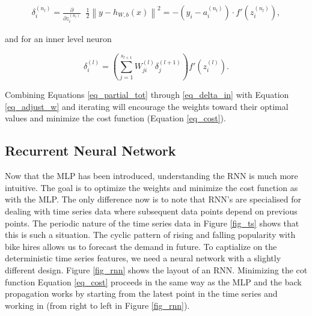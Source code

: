 \documentclass[10pt]{article}
\begin{document}
\begin{align}
\delta^{(n_l)}_i
= \frac{\partial}{\partial z^{(n_l)}_i} \;\;
\frac{1}{2} \left\|y - h_{W,b}(x)\right\|^2 = - (y_i - a^{(n_l)}_i) \cdot f'(z^{(n_l)}_i),
\label{eq_delta}
\end{align}


\noindent and for an inner level neuron

\begin{equation}
\delta^{(l)}_i = \left( \sum_{j=1}^{s_{l+1}} W^{(l)}_{ji} \delta^{(l+1)}_j \right) f'(z^{(l)}_i).
\label{eq_delta_in}
\end{equation}


Combining Equations \ref{eq_partial_tot} through \ref{eq_delta_in} with Equation \ref{eq_adjust_w} and iterating will encourage the weights toward their optimal values and minimize the cost function (Equation \ref{eq_cost}).




\subsection{Recurrent Neural Network}
Now that the MLP has been introduced, understanding the RNN is much more intuitive. The goal is to optimize the weights and minimize the cost function as with the MLP. The only difference now is to note that RNN's are specialised for dealing with time series data where subsequent data points depend on previous points. The periodic nature of the time series data in Figure \ref{fig_ts} shows that this is such a situation. The cyclic pattern of rising and falling popularity with bike hires allows us to forecast the demand in future. To captialize on the deterministic time series features, we need a neural network with a slightly different design. Figure \ref{fig_rnn} shows the layout of an RNN. Minimizing the cot function Equation \ref{eq_cost} proceeds in the same way as the MLP and the back propagation works by starting from the latest point in the time series and working in (from right to left in Figure \ref{fig_rnn}).
\end{document}
